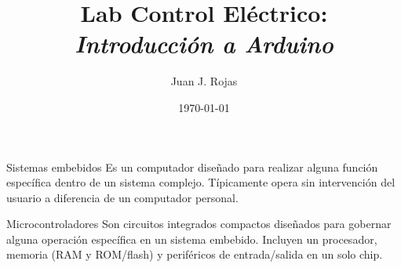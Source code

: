 \documentclass[aspectratio=169]{beamer}
\title{Lab Control Eléctrico: \\ \emph{Introducción a Arduino}}
\author{
    Juan J. Rojas
}
\institute{Instituto Tecnológico de Costa Rica}
\date{\today}
\begin{document}

\maketitle

\newcommand{\blackandwhite}{white} %


\begin{frame}[t]{Sistemas embebidos}
Es un computador diseñado para realizar alguna función específica dentro de un sistema complejo. Típicamente opera sin intervención del usuario a diferencia de un computador personal.  

\end{frame}

\begin{frame}[t]{Microcontroladores}
Son circuitos integrados compactos diseñados para gobernar alguna operación específica en un sistema embebido. Incluyen un procesador, memoria (RAM y ROM/flash) y periféricos de entrada/salida en un solo chip.

\end{frame}
\end{document}
